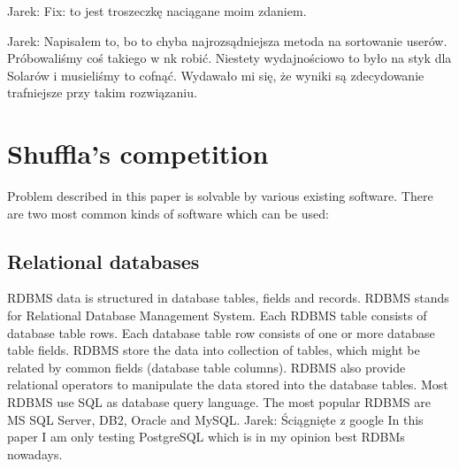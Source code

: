 \documentclass[10pt,a4paper]{article}
\newcommand{\jarek}[1]{\noindent\colorbox{myYellow}{Jarek: #1}}
\begin{document}
\jarek{Fix: to jest troszeczkę naciągane moim zdaniem.}

\jarek{Napisałem to, bo to chyba najrozsądniejsza metoda na sortowanie userów. Próbowaliśmy coś takiego w nk robić. Niestety wydajnościowo to było na styk dla Solarów i musieliśmy to cofnąć. Wydawało mi się, że wyniki są zdecydowanie trafniejsze przy takim rozwiązaniu. }

\section{Shuffla's competition}
Problem described in this paper is solvable by various existing software. There are two most common kinds of software which can be used:

\subsection{Relational databases}
RDBMS data is structured in database tables, fields and records. RDBMS stands for Relational Database Management System.  Each RDBMS table consists of database table rows. Each database table row consists of one or more database table fields.  RDBMS store the data into collection of tables, which might be related by common fields (database table columns). RDBMS also provide relational operators to manipulate the data stored into the database tables. Most RDBMS use SQL as database query language. The most popular RDBMS are MS SQL Server, DB2, Oracle and MySQL. \jarek{Ściągnięte z google}
In this paper I am only testing PostgreSQL which is in my opinion best RDBMs nowadays.
\end{document}
